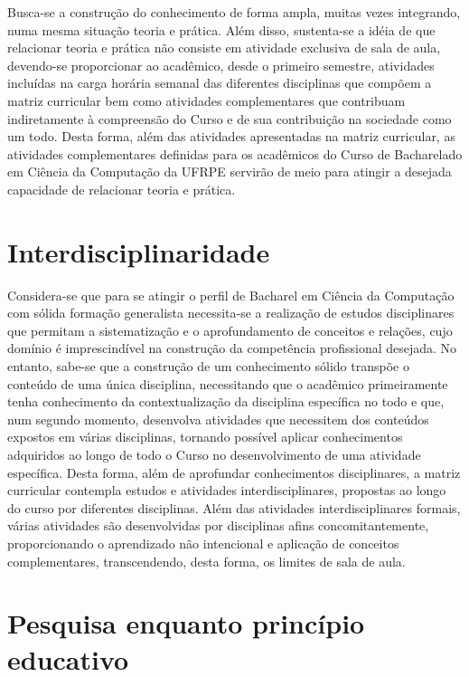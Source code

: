 \documentclass[
	12pt,				%
	openright,			%
  oneside,     %
	a4paper,			%
	english,			%
	french,				%
	spanish,			%
	brazil				%
	]{abntex2}
\begin{document}
Busca-se a construção do conhecimento de forma ampla, muitas vezes integrando,
numa mesma situação teoria e prática. Além disso, sustenta-se a idéia de que
relacionar teoria e prática não consiste em atividade exclusiva de sala de aula,
devendo-se proporcionar ao acadêmico, desde o primeiro semestre, atividades
incluídas na carga horária semanal das diferentes disciplinas que compõem a
matriz curricular bem como atividades complementares que contribuam
indiretamente à compreensão do Curso e de sua contribuição na sociedade como um
todo. Desta forma, além das atividades apresentadas na matriz curricular, as
atividades complementares definidas para os acadêmicos do Curso de Bacharelado
em Ciência da Computação da UFRPE servirão de meio para atingir a desejada
capacidade de relacionar teoria e prática. 

\section{Interdisciplinaridade}

Considera-se que para se atingir o perfil de Bacharel em Ciência da Computação com sólida
formação generalista necessita-se a realização de estudos disciplinares que
permitam a sistematização e o aprofundamento de conceitos e relações, cujo
domínio é imprescindível na construção da competência profissional desejada. No
entanto, sabe-se que a construção de um conhecimento sólido transpõe o conteúdo
de uma única disciplina, necessitando que o acadêmico primeiramente tenha
conhecimento da contextualização da disciplina específica no todo e que, num
segundo momento, desenvolva atividades que necessitem dos conteúdos expostos em
várias disciplinas, tornando possível aplicar conhecimentos adquiridos ao longo
de todo o Curso no desenvolvimento de uma atividade específica. Desta forma,
além de aprofundar conhecimentos disciplinares, a matriz curricular contempla
estudos e atividades interdisciplinares, propostas ao longo do curso por
diferentes disciplinas. Além das atividades interdisciplinares formais, várias
atividades são desenvolvidas por disciplinas afins concomitantemente,
proporcionando o aprendizado não intencional e aplicação de conceitos
complementares, transcendendo, desta forma, os limites de sala de aula. 

\section{Pesquisa enquanto princípio educativo}
\end{document}

